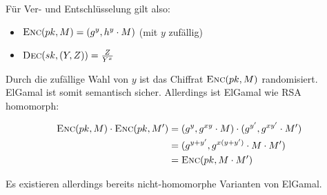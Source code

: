 Für Ver- und Entschlüsselung gilt also:
\begin{itemize}
  \item $\textsc{Enc}(pk,M) = (g^y, h^y \cdot M)$ (mit $y$ zufällig)
  \item $\textsc{Dec}(sk,(Y, Z)) = \frac{Z}{Y^x}$
\end{itemize}

Durch die zufällige Wahl von $y$ ist das Chiffrat $\textsc{Enc}({pk, M})$ randomisiert. ElGamal ist somit semantisch sicher. Allerdings ist ElGamal wie RSA
homomorph:

\begin{align*}
\textsc{Enc}({pk,M}) \cdot \textsc{Enc}({pk,M'})
&= (g^y, g^{xy} \cdot M) \cdot (g^{y'}, g^{xy'} \cdot M')\\
&= (g^{y+y'}, g^{x(y + y')} \cdot M \cdot M')\\
&= \textsc{Enc}({pk, M \cdot M'})
\end{align*}

Es existieren allerdings bereits nicht-homomorphe Varianten von ElGamal.
